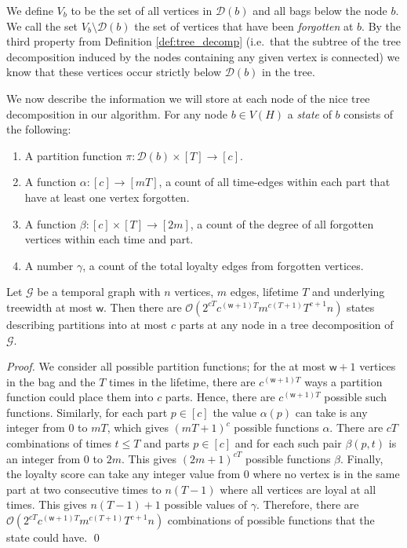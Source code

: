 \documentclass[runningheads]{llncs}
\newcommand{\cG}{\mathcal{G}}
\newcommand{\w}{\mathsf{w}}
\begin{document}
We define $V_b$ to be the set of all vertices in $\mathcal{D}(b)$ and all bags below the node $b$.
We call the set $V_b\setminus\mathcal{D}(b)$ the set of vertices that have been \emph{forgotten} at $b$. By the third property from Definition \ref{def:tree_decomp} (i.e.~that the subtree of the tree decomposition induced by the nodes containing any given vertex is connected) we know that these vertices occur strictly below $\mathcal{D}(b)$ in the tree.

We now describe the information we will store at each node of the nice tree decomposition in our algorithm.
For any node $b \in V(H)$ a \emph{state} of $b$ consists of the following:
\begin{enumerate}
    \item A partition function $\pi : \mathcal{D}(b) \times [T] \rightarrow [c]$.
    \item A function $\alpha : [c] \rightarrow [mT]$, a count of all time-edges within each part that have at least one vertex forgotten. 
    \item A function $\beta : [c]\times[T] \rightarrow [2m]$, a count of the degree of all forgotten vertices within each time and part.
    \item A number $\gamma$, a count of the total loyalty edges from forgotten vertices.
\end{enumerate}

\begin{lemma}\label{lem:state_count}
Let $\cG$ be a temporal graph with $n$ vertices, $m$ edges, lifetime $T$ and underlying treewidth at most $\w$. 
Then there are $\mathcal{O}(2^{cT}c^{(\w +1)T}m^{c(T+1)}T^{c+1}n)$ states describing partitions into at most $c$ parts at any node in a tree decomposition of $\cG$.
\end{lemma}
\begin{proof}
    We consider all possible partition functions; for the at most $\w +1$ vertices in the bag and the $T$ times in the lifetime, there are $c^{(\w +1)T}$ ways a partition function could place them into $c$ parts. Hence, there are $c^{(\w +1)T}$ possible such functions.
    Similarly, for each part $p \in [c]$ the value $\alpha(p)$ can take is any integer from $0$ to $mT$, which gives $(mT+1)^c$ possible functions $\alpha$.
    There are $cT$ combinations of times $t \leq T$ and parts $p\in [c]$ and for each such pair $\beta(p,t)$ is an integer from $0$ to $2m$. This gives $(2m+1)^{cT}$ possible functions $\beta$.
    Finally, the loyalty score can take any integer value from $0$ where no vertex is in the same part at two consecutive times to $n(T-1)$ where all vertices are loyal at all times. This gives $n(T-1)+1$ possible values of $\gamma$.
    Therefore, there are $\mathcal{O}(2^{cT}c^{(\w +1)T}m^{c(T+1)}T^{c+1}n)$ combinations of possible functions that the state could have. \qed
\end{proof}
\end{document}
